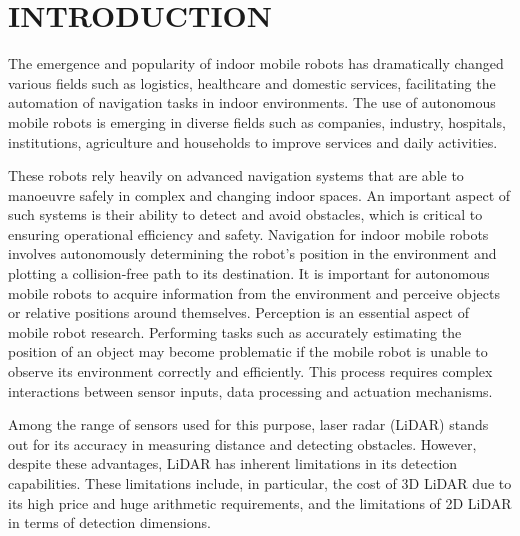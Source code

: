\section{INTRODUCTION}
\label{sec:introduction}

The emergence and popularity of indoor mobile robots has dramatically changed various fields such as logistics, healthcare and domestic services, facilitating the automation of navigation tasks in indoor environments.
The use of autonomous mobile robots is emerging in diverse fields such as companies, industry, hospitals, institutions, agriculture and households to improve services and daily activities.

These robots rely heavily on advanced navigation systems that are able to manoeuvre safely in complex and changing indoor spaces. An important aspect of such systems is their ability to detect and avoid obstacles, which is critical to ensuring operational efficiency and safety.
Navigation for indoor mobile robots involves autonomously determining the robot's position in the environment and plotting a collision-free path to its destination.
It is important for autonomous mobile robots to acquire information from the environment and perceive objects or relative positions around themselves. Perception is an essential aspect of mobile robot research. Performing tasks such as accurately estimating the position of an object may become problematic if the mobile robot is unable to observe its environment correctly and efficiently.
This process requires complex interactions between sensor inputs, data processing and actuation mechanisms.

Among the range of sensors used for this purpose, laser radar (LiDAR) stands out for its accuracy in measuring distance and detecting obstacles.
However, despite these advantages, LiDAR has inherent limitations in its detection capabilities. These limitations include, in particular, the cost of 3D LiDAR due to its high price and huge arithmetic requirements, and the limitations of 2D LiDAR in terms of detection dimensions.

